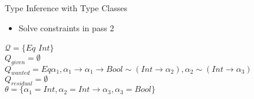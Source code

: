 \documentclass{beamer}
\begin{document}
\begin{frame}{Type Inference with Type Classes}
\begin{itemize}
\item Solve constraints in pass 2
\end{itemize}
$\mathcal{Q}=\{Eq$ $Int\}$\\
$Q_{given}=\emptyset$\\
$Q_{wanted}=Eq \alpha_1, \alpha_1 \rightarrow \alpha_1 \rightarrow Bool \sim 
            (Int \rightarrow \alpha_2), \alpha_2 \sim (Int \rightarrow \alpha_3)$\\
$Q_{residual}=\emptyset$\\
$\theta=\{\alpha_1=Int,\alpha_2=Int \rightarrow \alpha_3, \alpha_3=Bool\}$\\
\end{frame}
\end{document}
